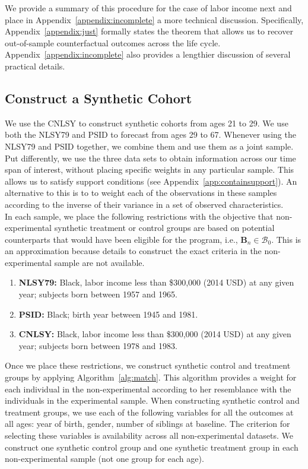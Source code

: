 \noindent We provide a summary of this procedure for the case of labor income next and place in Appendix~\ref{appendix:incomplete} a more technical discussion. Specifically, Appendix~\ref{appendix:just} formally states the theorem that allows us to recover out-of-sample counterfactual outcomes across the life cycle. Appendix~\ref{appendix:incomplete} also provides a lengthier discussion of several practical details.

\subsection{Construct a Synthetic Cohort}

We use the CNLSY to construct synthetic cohorts from ages 21 to 29. We use both the NLSY79 and PSID to forecast from ages 29 to 67. Whenever using the NLSY79 and PSID together, we combine them and use them as a joint sample. Put differently, we use the three data sets to obtain information across our time span of interest, without placing specific weights in any particular sample. This allows us to satisfy support conditions (see Appendix~\ref{app:containsupport}). An alternative to this is to to weight each of the observations in these samples according to the inverse of their variance in a set of observed characteristics.\\

\noindent In each sample, we place the following restrictions with the objective that non-experimental synthetic treatment or control groups are based on potential counterparts that would have been eligible for the program, i.e., $\bm{B}_{n} \in \mathcal{B}_0$. This is an approximation because details to construct the exact criteria in the non-experimental sample are not available.

\begin{enumerate}
\item \textbf{NLSY79:} Black, labor income less than \$300,000 (2014 USD) at any given year; subjects born between 1957 and 1965.
\item \textbf{PSID:} Black; birth year between 1945 and 1981.
\item \textbf{CNLSY:} Black, labor income less than \$300,000 (2014 USD) at any given year; subjects born between 1978 and 1983.
\end{enumerate}

\noindent Once we place these restrictions, we construct synthetic control and treatment groups by applying Algorithm~\ref{alg:match}. This algorithm provides a weight for each individual in the non-experimental according to her resemblance with the individuals in the experimental sample. When constructing synthetic control and treatment groups, we use each of the following variables for all the outcomes at all ages: year of birth, gender, number of siblings at baseline. The criterion for selecting these variables is availability across all non-experimental datasets. We construct one synthetic control group and one synthetic treatment group in each non-experimental sample (not one group for each age).\\

